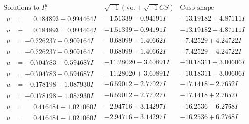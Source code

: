 \documentclass[1p]{elsarticle_modified}
\theoremstyle{definition}
\newcommand{\I}{\sqrt{-1}}
\begin{document}
$$\begin{array}{c|c|c}  
\text{Solutions to }I^u_{1}& \I (\text{vol} + \sqrt{-1}CS) & \text{Cusp shape}\\
 \hline 
\begin{aligned}
u &= \phantom{-}0.184893 + 0.994464 I\end{aligned}
 & -1.51339 - 0.94191 I & -13.19182 + 4.87111 I \\ \hline\begin{aligned}
u &= \phantom{-}0.184893 - 0.994464 I\end{aligned}
 & -1.51339 + 0.94191 I & -13.19182 - 4.87111 I \\ \hline\begin{aligned}
u &= -0.326237 + 0.909164 I\end{aligned}
 & -0.68099 - 1.40662 I & -7.42529 + 4.24722 I \\ \hline\begin{aligned}
u &= -0.326237 - 0.909164 I\end{aligned}
 & -0.68099 + 1.40662 I & -7.42529 - 4.24722 I \\ \hline\begin{aligned}
u &= -0.704783 + 0.594687 I\end{aligned}
 & -11.28020 - 3.60891 I & -10.18311 + 3.00606 I \\ \hline\begin{aligned}
u &= -0.704783 - 0.594687 I\end{aligned}
 & -11.28020 + 3.60891 I & -10.18311 - 3.00606 I \\ \hline\begin{aligned}
u &= -0.178198 + 1.087930 I\end{aligned}
 & -6.59012 + 2.77027 I & -17.1418 - 2.7652 I \\ \hline\begin{aligned}
u &= -0.178198 - 1.087930 I\end{aligned}
 & -6.59012 - 2.77027 I & -17.1418 + 2.7652 I \\ \hline\begin{aligned}
u &= \phantom{-}0.416484 + 1.021060 I\end{aligned}
 & -2.94716 + 3.14297 I & -16.2536 - 6.2768 I \\ \hline\begin{aligned}
u &= \phantom{-}0.416484 - 1.021060 I\end{aligned}
 & -2.94716 - 3.14297 I & -16.2536 + 6.2768 I \\ \hline\begin{aligned}

\end{aligned}
\end{array}$$
\end{document}
